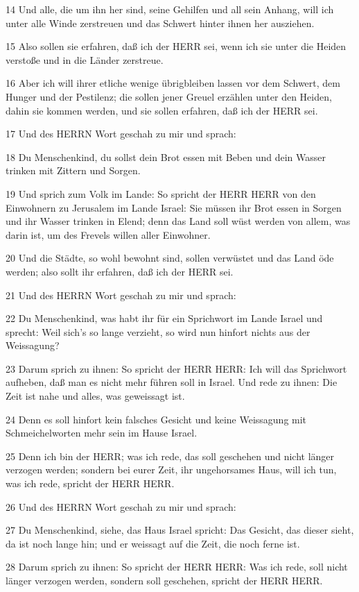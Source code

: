\par 14 Und alle, die um ihn her sind, seine Gehilfen und all sein Anhang, will ich unter alle Winde zerstreuen und das Schwert hinter ihnen her ausziehen.
\par 15 Also sollen sie erfahren, daß ich der HERR sei, wenn ich sie unter die Heiden verstoße und in die Länder zerstreue.
\par 16 Aber ich will ihrer etliche wenige übrigbleiben lassen vor dem Schwert, dem Hunger und der Pestilenz; die sollen jener Greuel erzählen unter den Heiden, dahin sie kommen werden, und sie sollen erfahren, daß ich der HERR sei.
\par 17 Und des HERRN Wort geschah zu mir und sprach:
\par 18 Du Menschenkind, du sollst dein Brot essen mit Beben und dein Wasser trinken mit Zittern und Sorgen.
\par 19 Und sprich zum Volk im Lande: So spricht der HERR HERR von den Einwohnern zu Jerusalem im Lande Israel: Sie müssen ihr Brot essen in Sorgen und ihr Wasser trinken in Elend; denn das Land soll wüst werden von allem, was darin ist, um des Frevels willen aller Einwohner.
\par 20 Und die Städte, so wohl bewohnt sind, sollen verwüstet und das Land öde werden; also sollt ihr erfahren, daß ich der HERR sei.
\par 21 Und des HERRN Wort geschah zu mir und sprach:
\par 22 Du Menschenkind, was habt ihr für ein Sprichwort im Lande Israel und sprecht: Weil sich's so lange verzieht, so wird nun hinfort nichts aus der Weissagung?
\par 23 Darum sprich zu ihnen: So spricht der HERR HERR: Ich will das Sprichwort aufheben, daß man es nicht mehr führen soll in Israel. Und rede zu ihnen: Die Zeit ist nahe und alles, was geweissagt ist.
\par 24 Denn es soll hinfort kein falsches Gesicht und keine Weissagung mit Schmeichelworten mehr sein im Hause Israel.
\par 25 Denn ich bin der HERR; was ich rede, das soll geschehen und nicht länger verzogen werden; sondern bei eurer Zeit, ihr ungehorsames Haus, will ich tun, was ich rede, spricht der HERR HERR.
\par 26 Und des HERRN Wort geschah zu mir und sprach:
\par 27 Du Menschenkind, siehe, das Haus Israel spricht: Das Gesicht, das dieser sieht, da ist noch lange hin; und er weissagt auf die Zeit, die noch ferne ist.
\par 28 Darum sprich zu ihnen: So spricht der HERR HERR: Was ich rede, soll nicht länger verzogen werden, sondern soll geschehen, spricht der HERR HERR.

